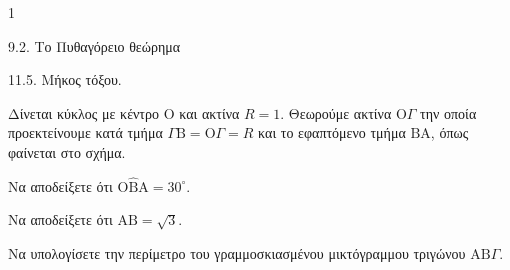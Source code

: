 \begin{ylh}{1}
    \item 9.2. Το Πυθαγόρειο θεώρημα
    \item 11.5. Μήκος τόξου.
\end{ylh}
\begin{figure}
\centering
{}
\end{figure}
Δίνεται κύκλος με κέντρο Ο και ακτίνα $R = 1$. Θεωρούμε ακτίνα Ο$\Gamma$ την οποία προεκτείνουμε κατά τμήμα $\Gamma \text{Β} = \text{Ο}\Gamma = R$ και το εφαπτόμενο τμήμα $\text{ΒΑ}$, όπως φαίνεται στο σχήμα.

\begin{alist}
\item Να αποδείξετε ότι $\text{Ο}\widehat{\text{Β}}\text{Α} = 30^{\circ}$. 
\item Να αποδείξετε ότι $\text{ΑΒ} = \sqrt{3}$. 
\item Να υπολογίσετε την περίμετρο του γραμμοσκιασμένου μικτόγραμμου τριγώνου $\text{ΑΒ}\Gamma$. 
\end{alist}